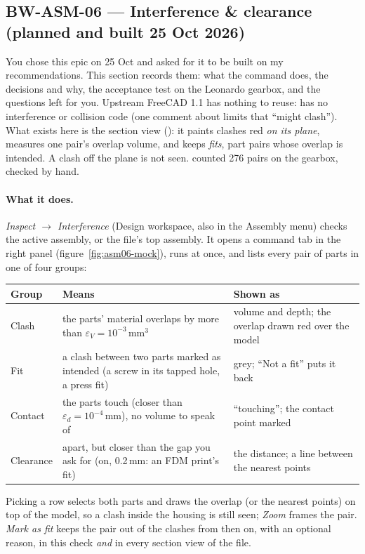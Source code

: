 \subsection{BW-ASM-06 --- Interference \& clearance (planned and built 25 Oct 2026)}\label{sec:asm06-plan}

You chose this epic on 25 Oct and asked for it to be built on my recommendations. This section records them: what
the command does, the decisions and why, the acceptance test on the Leonardo gearbox, and the questions left for you.
Upstream FreeCAD 1.1 has nothing to reuse:  has no interference or collision code (one
comment about limits that ``might clash''). What exists here is the section view (): it paints clashes
red \emph{on its plane}, measures one pair's overlap volume, and keeps \emph{fits}, part pairs whose overlap is
intended. A clash off the plane is not seen.  counted 276 pairs on the gearbox, checked by hand.

\paragraph{What it does.} \emph{Inspect $\rightarrow$ Interference} (Design workspace, also in the Assembly menu)
checks the active assembly, or the file's top assembly. It opens a command tab in the right panel
(figure~\ref{fig:asm06-mock}), runs at once, and lists every pair of parts in one of four groups:
\begin{center}
\small
\begin{tabularx}{\linewidth}{@{}l>{\hsize=1.1\hsize}X>{\hsize=0.9\hsize}X@{}}
\toprule
Group & Means & Shown as\\
\midrule
Clash & the parts' material overlaps by more than $\varepsilon_V=10^{-3}$\,mm$^3$ & volume and depth; the overlap drawn
  red over the model\\
Fit & a clash between two parts marked as intended (a screw in its tapped hole, a press fit) & grey; ``Not a fit''
  puts it back\\
Contact & the parts touch (closer than $\varepsilon_d=10^{-4}$\,mm), no volume to speak of & ``touching''; the
  contact point marked\\
Clearance & apart, but closer than the gap you ask for (on, 0.2\,mm: an FDM print's fit) & the distance; a line
  between the nearest points\\
\bottomrule
\end{tabularx}
\end{center}
Picking a row selects both parts and draws the overlap (or the nearest points) on top of the model, so a clash
inside the housing is still seen; \emph{Zoom} frames the pair. \emph{Mark as fit} keeps the pair out of the clashes
from then on, with an optional reason, in this check \emph{and} in every section view of the file.

